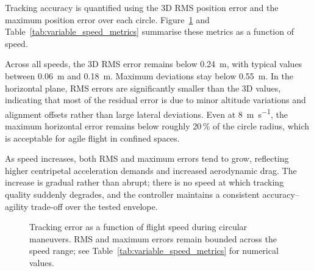 Tracking accuracy is quantified using the 3D RMS position error and the maximum position error over each circle.
Figure~\ref{fig:tracking_error_vs_speed} and Table~\ref{tab:variable_speed_metrics} summarise these metrics as a function of speed.

Across all speeds, the 3D RMS error remains below \SI{0.24}{\meter}, with typical values between \SI{0.06}{\meter} and \SI{0.18}{\meter}.
Maximum deviations stay below \SI{0.55}{\meter}.
In the horizontal plane, RMS errors are significantly smaller than the 3D values, indicating that most of the residual error is due to minor altitude variations and alignment offsets rather than large lateral deviations.
Even at \SI{8}{\meter\per\second}, the maximum horizontal error remains below roughly 20\,\% of the circle radius, which is acceptable for agile flight in confined spaces.

As speed increases, both RMS and maximum errors tend to grow, reflecting higher centripetal acceleration demands and increased aerodynamic drag.
The increase is gradual rather than abrupt; there is no speed at which tracking quality suddenly degrades, and the controller maintains a consistent accuracy--agility trade-off over the tested envelope.

\begin{figure}[htbp]
  \centering
  \caption{Tracking error as a function of flight speed during circular maneuvers. RMS and maximum errors remain bounded across the speed range; see Table~\ref{tab:variable_speed_metrics} for numerical values.}
  \label{fig:tracking_error_vs_speed}
\end{figure}

